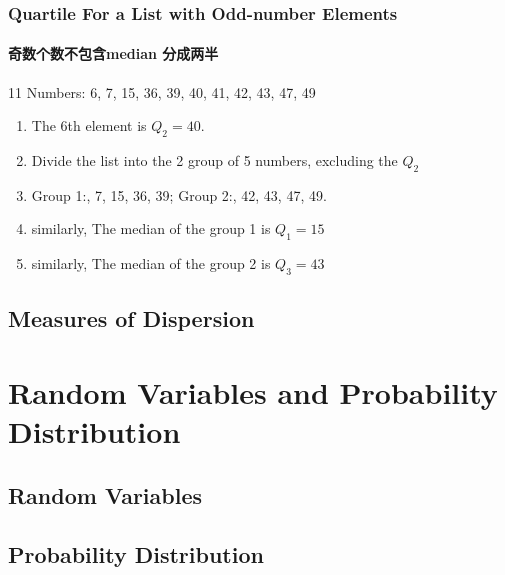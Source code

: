 \documentclass[
	11pt, %
]{beamer}
\begin{document}

\begin{frame}
	\frametitle{Quartile For a List with Odd-number Elements}
	\framesubtitle{奇数个数不包含median 分成两半}

	\begin{example}
	11 Numbers: 6, 7, 15, 36, 39, 40, 41, 42, 43, 47, 49\\
	\begin{enumerate}
		\item The 6th element is $Q_2=40$.
		\item Divide the list into  the 2 group of 5 numbers, excluding the $Q_2$
		\item Group 1:, 7, 15, 36, 39;   Group 2:, 42, 43, 47, 49.
		\item similarly, The median of the group 1 is $Q_1=15$
		\item similarly, The median of the group 2 is $Q_3=43$
	\end{enumerate}
	\end{example}
\end{frame}




\subsection{Measures of Dispersion}



\section{Random Variables and Probability Distribution}


\subsection{Random Variables}


\subsection{Probability Distribution}
\end{document}
